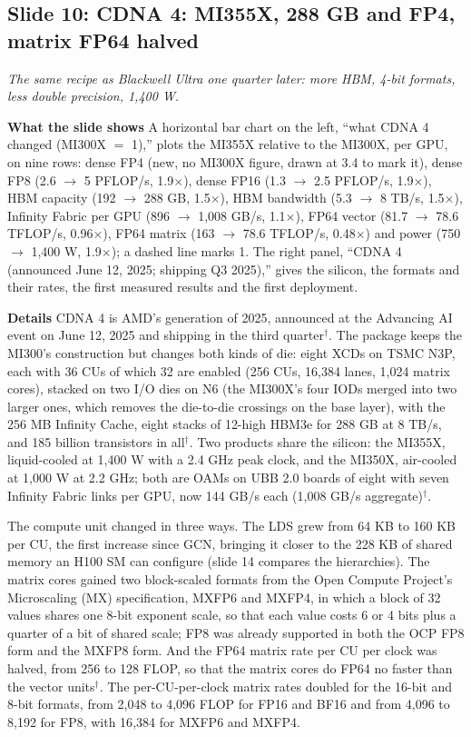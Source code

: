 \documentclass[11pt,letterpaper]{article}
\newcommand{\slide}[3]{%
  \subsection[Slide #1: #2]{Slide #1: #2}%
  {\color{muted}\itshape #3\par}\medskip}
\newcommand{\para}[1]{\medskip\noindent\textbf{#1}\quad}
\begin{document}
\slide{10}{CDNA 4: MI355X, 288 GB and FP4, matrix FP64 halved}{The same recipe as Blackwell Ultra one quarter later: more HBM, 4-bit formats, less double precision, 1,400 W.}

\para{What the slide shows} A horizontal bar chart on the left, ``what CDNA 4 changed (MI300X $=$ 1),'' plots the MI355X relative to the MI300X, per GPU, on nine rows: dense FP4 (new, no MI300X figure, drawn at 3.4 to mark it), dense FP8 (2.6 $\to$ 5 PFLOP/s, 1.9$\times$), dense FP16 (1.3 $\to$ 2.5 PFLOP/s, 1.9$\times$), HBM capacity (192 $\to$ 288 GB, 1.5$\times$), HBM bandwidth (5.3 $\to$ 8 TB/s, 1.5$\times$), Infinity Fabric per GPU (896 $\to$ 1{,}008 GB/s, 1.1$\times$), FP64 vector (81.7 $\to$ 78.6 TFLOP/s, 0.96$\times$), FP64 matrix (163 $\to$ 78.6 TFLOP/s, 0.48$\times$) and power (750 $\to$ 1{,}400 W, 1.9$\times$); a dashed line marks 1. The right panel, ``CDNA 4 (announced June 12, 2025; shipping Q3 2025),'' gives the silicon, the formats and their rates, the first measured results and the first deployment.

\para{Details} CDNA 4 is AMD's generation of 2025, announced at the Advancing AI event on June 12, 2025 and shipping in the third quarter$^\dagger$. The package keeps the MI300's construction but changes both kinds of die: eight XCDs on TSMC N3P, each with 36 CUs of which 32 are enabled (256 CUs, 16{,}384 lanes, 1{,}024 matrix cores), stacked on two I/O dies on N6 (the MI300X's four IODs merged into two larger ones, which removes the die-to-die crossings on the base layer), with the 256 MB Infinity Cache, eight stacks of 12-high HBM3e for 288 GB at 8 TB/s, and 185 billion transistors in all$^\dagger$. Two products share the silicon: the MI355X, liquid-cooled at 1{,}400 W with a 2.4 GHz peak clock, and the MI350X, air-cooled at 1{,}000 W at 2.2 GHz; both are OAMs on UBB 2.0 boards of eight with seven Infinity Fabric links per GPU, now 144 GB/s each (1{,}008 GB/s aggregate)$^\dagger$.

The compute unit changed in three ways. The LDS grew from 64 KB to 160 KB per CU, the first increase since GCN, bringing it closer to the 228 KB of shared memory an H100 SM can configure (slide 14 compares the hierarchies). The matrix cores gained two block-scaled formats from the Open Compute Project's Microscaling (MX) specification, MXFP6 and MXFP4, in which a block of 32 values shares one 8-bit exponent scale, so that each value costs 6 or 4 bits plus a quarter of a bit of shared scale; FP8 was already supported in both the OCP FP8 form and the MXFP8 form. And the FP64 matrix rate per CU per clock was halved, from 256 to 128 FLOP, so that the matrix cores do FP64 no faster than the vector units$^\dagger$. The per-CU-per-clock matrix rates doubled for the 16-bit and 8-bit formats, from 2{,}048 to 4{,}096 FLOP for FP16 and BF16 and from 4{,}096 to 8{,}192 for FP8, with 16{,}384 for MXFP6 and MXFP4.
\end{document}
